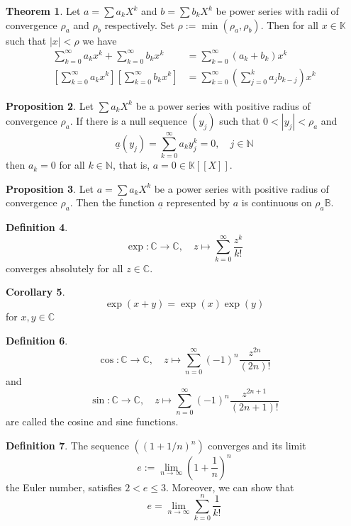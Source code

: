 \documentclass[12pt,a4paper]{book}
\newcommand{\bb}[1]{\mathbb{#1}}
\theoremstyle{definition}
\newtheorem{defn}{Definition}[section]
\newtheorem{coro}[defn]{Corollary}
\newtheorem{theo}[defn]{Theorem}
\newtheorem{prop}[defn]{Proposition}
\begin{document}
\begin{theo}
    Let $a=\sum a_k X^k$ and $b=\sum b_k X^k$ be power series with radii of convergence $\rho_a$ and $\rho_b$ respectively. Set $\rho:=\min \left(\rho_a, \rho_b\right)$. Then for all $x \in \mathbb{K}$ such that $|x|<\rho$ we have
    $$
    \begin{aligned}
    \sum_{k=0}^{\infty} a_k x^k+\sum_{k=0}^{\infty} b_k x^k & =\sum_{k=0}^{\infty}\left(a_k+b_k\right) x^k \\
    {\left[\sum_{k=0}^{\infty} a_k x^k\right]\left[\sum_{k=0}^{\infty} b_k x^k\right] } & =\sum_{k=0}^{\infty}\left(\sum_{j=0}^k a_j b_{k-j}\right) x^k
    \end{aligned}
    $$
\end{theo}
\begin{prop}
    Let $\sum a_k X^k$ be a power series with positive radius of convergence $\rho_a$. If there is a null sequence $\left(y_j\right)$ such that $0<\left|y_j\right|<\rho_a$ and
    $$
    \underline{a}\left(y_j\right)=\sum_{k=0}^{\infty} a_k y_j^k=0, \quad j \in \mathbb{N}
    $$
    then $a_k=0$ for all $k \in \mathbb{N}$, that is, $a=0 \in \mathbb{K} [[X]]$.
\end{prop}
\begin{prop}
    Let $a=\sum a_k X^k$ be a power series with positive radius of convergence $\rho_a$. Then the function $\underline{a}$ represented by $a$ is continuous on $\rho_a \mathbb{B}$.
\end{prop}
\begin{defn}
    $$
        \exp : \mathbb{C} \rightarrow \mathbb{C}, \quad z \mapsto \sum_{k=0}^{\infty} \frac{z^k}{k !}
    $$
    converges absolutely for all $z\in \bb{C}$.
\end{defn}
\begin{coro}
    $$\exp(x+y)=\exp(x)\exp(y) $$ for $x,y\in \bb{C}$
\end{coro}
\begin{defn}
    $$
    \cos : \mathbb{C} \rightarrow \mathbb{C}, \quad z \mapsto \sum_{n=0}^{\infty}(-1)^n \frac{z^{2 n}}{(2 n)!}
    $$
    and
    $$
    \sin : \mathbb{C} \rightarrow \mathbb{C}, \quad z \mapsto \sum_{n=0}^{\infty}(-1)^n \frac{z^{2 n+1}}{(2 n+1)!}
    $$
    are called the cosine and sine functions. 
\end{defn}
\begin{defn}
    The sequence $\left((1+1 / n)^n\right)$ converges and its limit
    $$
    e:=\lim _{n \rightarrow \infty}\left(1+\frac{1}{n}\right)^n
    $$
    the Euler number, satisfies $2<e \leq 3$.
    Moreover, we can show that 
    $$  
    e=\lim _{n \rightarrow \infty} \sum_{k=0}^n \frac{1}{k!}
    $$
\end{defn}
\end{document}
